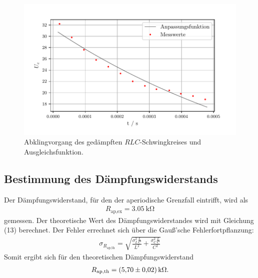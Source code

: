 \begin{figure}[H]
  \centering
  \includegraphics{plota.pdf}
  \caption{Abklingvorgang des gedämpften $\mathit{RLC}$-Schwingkreises und Ausgleichsfunktion.}
  \label{fig:Plot a}
\end{figure}

\subsection{Bestimmung des Dämpfungswiderstands }
Der Dämpfungswiderstand, für den der aperiodische Grenzfall eintrifft, wird als 
\begin{align*}
R_\text{ap,ex} = \SI{3,05}{\kilo\ohm}
\end{align*}
gemessen.
Der theoretische Wert des Dämpfungswiderstandes wird mit Gleichung (13) berechnet.
Der Fehler errechnet sich über die Gauß'sche Fehlerfortpflanzung:
\begin{align*}
\sigma_{R_\text{ap,th}} = \sqrt{\frac{\sigma_{L}^{2}\frac{L}{C}}{L^{2}} + \frac{\sigma_{C}^{2} \frac{L}{C}}{C^{2}}}
\end{align*}
Somit ergibt sich für den theoretischen Dämpfungswiderstand
\begin{align*}
R_\text{ap,th} = \SI{5.7 \pm 0.02}{\kilo\ohm}.
\end{align*}

